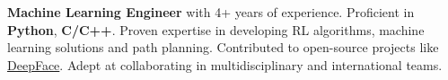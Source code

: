   \item{\textbf{Machine Learning Engineer} with 4+ years of experience. Proficient in \textbf{Python}, \textbf{C/C++}. Proven expertise in developing RL algorithms, machine learning solutions and path planning. Contributed to open-source projects like \href{https://github.com/serengil/deepface}{DeepFace}. Adept at collaborating in multidisciplinary and international teams.}
  \resumeSubHeadingListEnd
